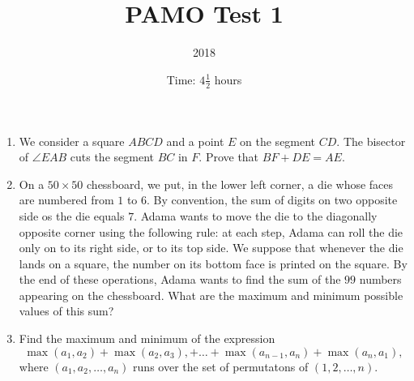 \documentclass{article}
\title{PAMO Test 1}
\author{2018}
\date{Time: $4\frac{1}{2}$ hours}
\begin{document}
\maketitle

\begin{enumerate}

\item %
We consider a square $ABCD$ and a point $E$ on the segment $CD$. The bisector of
$\angle EAB$ cuts the segment $BC$ in $F$. Prove that $BF + DE = AE$.

\item %
On a $50 \times 50$ chessboard, we put, in the lower left corner, a die whose
faces are numbered from $1$ to $6$. By convention, the sum of digits on two
opposite side os the die equals $7$. Adama wants to move the die to the
diagonally opposite corner using the following rule: at each step, Adama can
roll the die only on to its right side, or to its top side. We suppose that
whenever the die lands on a square, the number on its bottom face is printed on
the square. By the end of these operations, Adama wants to find the sum of the
$99$ numbers appearing on the chessboard. What are the maximum and minimum
possible values of this sum?

\item %
Find the maximum and minimum of the expression
\[
    \max(a_1, a_2) + \max(a_2, a_3), + \dots + \max(a_{n-1}, a_n) + \max(a_n, a_1),
\]
where $(a_1, a_2, \dots, a_n)$ runs over the set of permutatons of $(1, 2,
\dots, n)$.

\end{enumerate}
\end{document}
